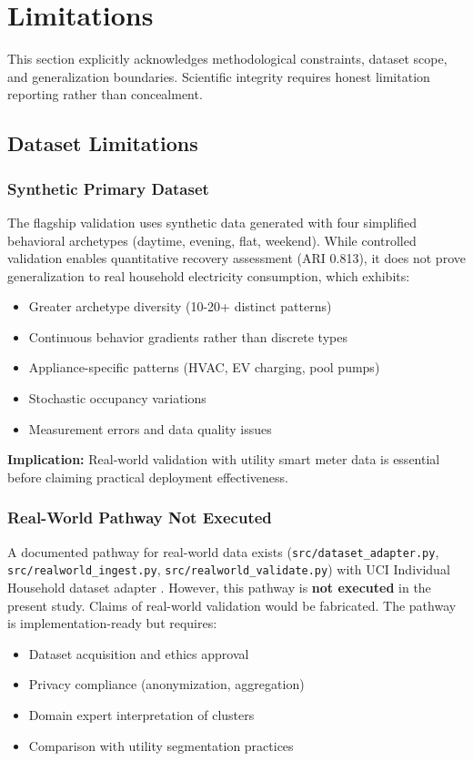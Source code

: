\section{Limitations}
\label{sec:limitations}

This section explicitly acknowledges methodological constraints, dataset scope, and generalization boundaries. Scientific integrity requires honest limitation reporting rather than concealment.

\subsection{Dataset Limitations}

\subsubsection{Synthetic Primary Dataset}

The flagship validation uses synthetic data generated with four simplified behavioral archetypes (daytime, evening, flat, weekend). While controlled validation enables quantitative recovery assessment (ARI 0.813), it does not prove generalization to real household electricity consumption, which exhibits:
\begin{itemize}
    \item Greater archetype diversity (10-20+ distinct patterns)
    \item Continuous behavior gradients rather than discrete types
    \item Appliance-specific patterns (HVAC, EV charging, pool pumps)
    \item Stochastic occupancy variations
    \item Measurement errors and data quality issues
\end{itemize}

\textbf{Implication:} Real-world validation with utility smart meter data is essential before claiming practical deployment effectiveness.

\subsubsection{Real-World Pathway Not Executed}

A documented pathway for real-world data exists (\texttt{src/dataset\_adapter.py}, \texttt{src/realworld\_ingest.py}, \texttt{src/realworld\_validate.py}) with UCI Individual Household dataset adapter \cite{uci_household}. However, this pathway is \textbf{not executed} in the present study. Claims of real-world validation would be fabricated. The pathway is implementation-ready but requires:
\begin{itemize}
    \item Dataset acquisition and ethics approval
    \item Privacy compliance (anonymization, aggregation)
    \item Domain expert interpretation of clusters
    \item Comparison with utility segmentation practices
\end{itemize}


